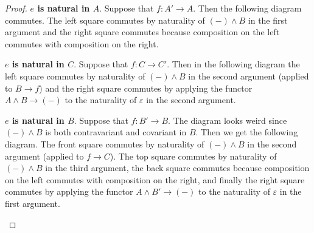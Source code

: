 \documentclass{article}
\newcommand{\pmap}{\to}
\renewcommand{\smash}{\wedge}
\renewcommand{\epsilon}{\varepsilon}
\begin{document}
\begin{proof}
\textbf{$e$ is natural in $A$}. Suppose that $f:A'\pmap A$. Then the following diagram commutes. The left square commutes by naturality of $({-})\smash B$ in the first argument and the right square commutes because composition on the left commutes with composition on the right.
\begin{center}
\end{center}

\textbf{$e$ is natural in $C$}. Suppose that $f:C\pmap C'$. Then in the following diagram the left square commutes by naturality of $({-})\smash B$ in the second argument (applied to $B\pmap f$) and the right square commutes by applying the functor $A\smash B \pmap({-})$ to the naturality of $\epsilon$ in the second argument.
\begin{center}
\end{center}

\textbf{$e$ is natural in $B$}. Suppose that $f:B'\pmap B$. The diagram looks weird since $({-})\smash B$ is both contravariant and covariant in $B$. Then we get the following diagram. The front square commutes by naturality of $({-})\smash B$ in the second argument (applied to $f\pmap C$). The top square commutes by naturality of $({-})\smash B$ in the third argument, the back square commutes because composition on the left commutes with composition on the right, and finally the right square commutes by applying the functor $A\smash B' \pmap({-})$ to the naturality of $\epsilon$ in the first argument.
\begin{center}
\end{center}


\end{proof}
\end{document}
